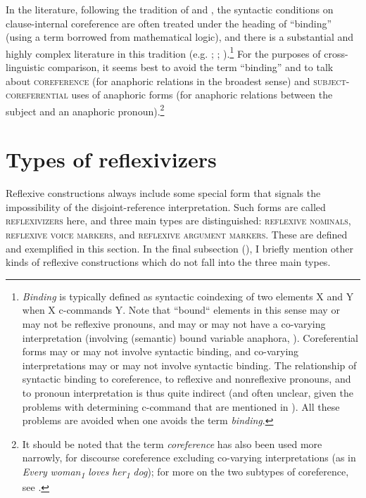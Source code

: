 \documentclass[output=paper]{langscibook}
\begin{document}
 In the literature, following the tradition of \citet{Reinhart1976,Reinhart1983a} and \citet{Chomsky1981}, the syntactic conditions on clause-internal coreference are often treated under the heading of “binding” (using a term borrowed from mathematical logic), and there is a substantial and highly complex literature in this tradition (e.g. \citealt{Everaert2003}; \citealt{Büring2005}; \citealt{Truswell2014}).\footnote{ {\textit{Binding}} {is typically defined as syntactic coindexing of two elements X and Y when X c-commands Y. Note that “bound“ elements in this sense may or may not be reflexive pronouns, and may or may not have a co-varying interpretation (involving (semantic) bound variable anaphora, ). Coreferential forms may or may not involve syntactic binding, and co-varying interpretations may or may not involve syntactic binding. The relationship of syntactic binding to coreference, to reflexive and nonreflexive pronouns, and to pronoun interpretation is thus quite indirect (and often unclear, given the problems with determining c-command that are mentioned in ). All these problems are avoided when one avoids the term} {\textit{binding}}.} For the purposes of cross-linguistic comparison, it seems best to avoid the term “binding” and to talk about \textsc{coreference} (for anaphoric relations in the broadest sense) and \textsc{subject-coreferential} uses of anaphoric forms (for anaphoric relations between the subject and an anaphoric pronoun).\footnote{ {It should be noted that the term} {\textit{coreference}} {has also been used more narrowly, for discourse coreference excluding co-varying interpretations (as in} {\textit{Every} \textit{woman}}{\textit{\textsubscript{1}}}{ \textit{loves} \textit{her}}{\textit{\textsubscript{1}}}{ \textit{dog}}{); for more on the two subtypes of coreference, see }.}


\section{Types of reflexivizers}\label{sec:Haspelmath:5}
Reflexive constructions always include some special form that signals the impossibility of the disjoint-reference interpretation. Such forms are called \textsc{reflexivizers} here, and three main types are distinguished: \textsc{reflexive} \textsc{nominals}, \textsc{reflexive} \textsc{voice} \textsc{markers}, and \textsc{reflexive} \textsc{argument} \textsc{markers}. These are defined and exemplified in this section. In the final subsection (), I briefly mention other kinds of reflexive constructions which do not fall into the three main types.
\end{document}
